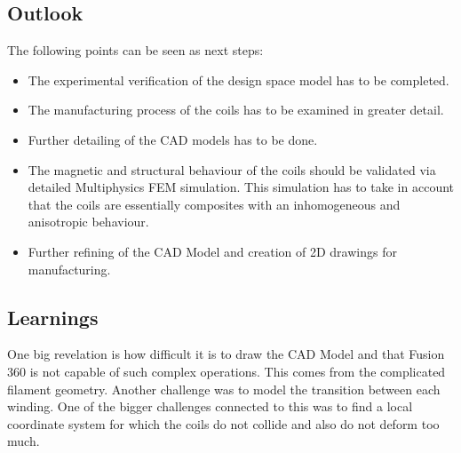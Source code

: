 \subsection{Outlook}
The following points can be seen as next steps:
\begin{itemize}
    \item The experimental verification of the design space model has to be completed.
    \item The manufacturing process of the coils has to be examined in greater detail.
    \item Further detailing of the CAD models has to be done.
    \item The magnetic and structural behaviour of the coils should be validated via detailed Multiphysics FEM simulation. This simulation has to take in account that the coils are essentially composites with an inhomogeneous and anisotropic behaviour.
    \item Further refining of the CAD Model and creation of 2D drawings for manufacturing.
\end{itemize}

\subsection{Learnings}
One big revelation is how difficult it is to draw the CAD Model and that Fusion 360 is not capable of such complex operations.
This comes from the complicated filament geometry.
Another challenge was to model the transition between each winding.
One of the bigger challenges connected to this was to find a local coordinate system for which the coils do not collide and also do not deform too much.







